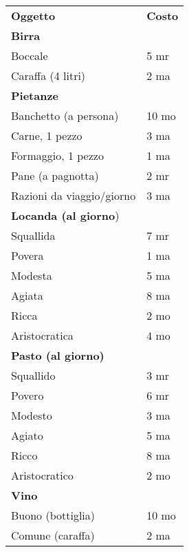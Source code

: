 \documentclass[landscape,10pt,a4paper]{article}
\begin{document}
\begin{multicols}{2}
\begin{dmbox}[title=Costi vari]	
	\begin{tabular}{ll}
		\textbf{Oggetto}&\textbf{Costo}\\
		\textbf{Birra}&\\
		Boccale&5 mr\\
		Caraffa (4 litri)&2 ma\\
		\textbf{Pietanze} &\\
		Banchetto (a persona)&10 mo\\
		Carne, 1 pezzo&3 ma\\
		Formaggio, 1 pezzo&1 ma\\
		Pane (a pagnotta)&2 mr\\
		Razioni da viaggio/giorno& 3 ma \\
		\textbf{Locanda (al giorno})&\\
		Squallida&7 mr\\
		Povera&1 ma\\
		Modesta&5 ma\\
		Agiata&8 ma\\
		Ricca&2 mo\\
		Aristocratica&4 mo\\
		\textbf{Pasto (al giorno)}&\\
		Squallido&3 mr\\
		Povero&6 mr\\
		Modesto&3 ma\\
		Agiato&5 ma\\
		Ricco&8 ma\\
		Aristocratico&2 mo\\
		\textbf{Vino}&\\
		Buono (bottiglia)&10 mo\\
		Comune (caraffa)&2 ma\\
	\end{tabular}			
\end{dmbox}	



\end{multicols}
	
\end{document}
